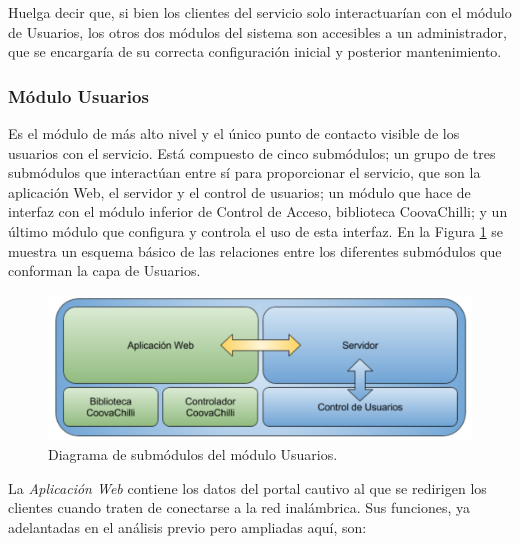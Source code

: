 Huelga decir que, si bien los clientes del servicio solo interactuarían con el módulo de Usuarios, los otros dos módulos del sistema son accesibles a un administrador, que se encargaría de su correcta configuración inicial y posterior mantenimiento.

\subsubsection{Módulo Usuarios}
Es el módulo de más alto nivel y el único punto de contacto visible de los usuarios con el servicio. Está compuesto de cinco submódulos; un grupo de tres submódulos que interactúan entre sí para proporcionar el servicio, que son la aplicación Web, el servidor y el control de usuarios; un módulo que hace de interfaz con el módulo inferior de Control de Acceso, biblioteca CoovaChilli; y un último módulo que configura y controla el uso de esta interfaz. En la Figura \ref{moduloUsers} se muestra un esquema básico de las relaciones entre los diferentes submódulos que conforman la capa de Usuarios.

\begin{figure}[!t]
\begin{center}
\includegraphics[width=0.75\linewidth]{./4_AnalisisFuncional/Img/moduloUsers.png}
\end{center}
\caption{Diagrama de submódulos del módulo Usuarios.}
\label{moduloUsers}
\end{figure}

La \emph{Aplicación Web} contiene los datos del portal cautivo al que se redirigen los clientes cuando traten de conectarse a la red inalámbrica. Sus funciones, ya adelantadas en el análisis previo pero ampliadas aquí, son:

